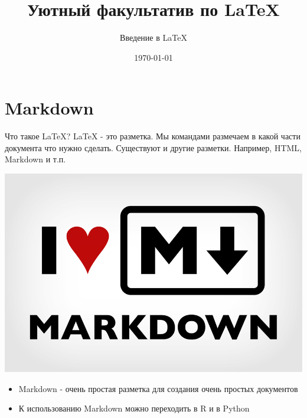 \documentclass[newPxFont]{beamer}
\title{Уютный факультатив по \LaTeX}
\subtitle{Введение в \LaTeX}
\date{\today}
\begin{document}
 \maketitle
 

\begin{frame}

\end{frame} 


\begin{frame}

\end{frame}

\begin{frame}

\end{frame} 


\begin{frame}

\end{frame}

\begin{frame}

\end{frame} 


\begin{frame}

\end{frame}


\section{Markdown}

\begin{frame}
Что такое \LaTeX? \LaTeX{} - это разметка. Мы командами размечаем в какой части документа что нужно сделать. Существуют и другие разметки. Например, HTML, Markdown и т.п.
\end{frame}


\begin{frame}
\begin{center}
\includegraphics[width=0.6\linewidth]{md.png}
\end{center}
\begin{itemize}
\item Markdown - очень простая разметка для создания очень простых документов
\item К использованию Markdown можно переходить в R и в Python
\end{itemize}

\end{frame}
\end{document}
